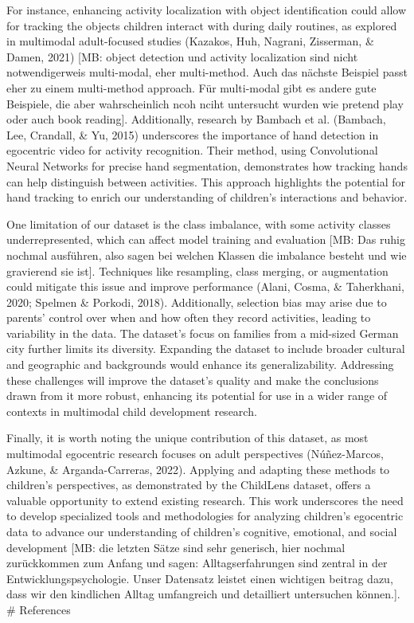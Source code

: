 \documentclass[
  man,floatsintext]{apa6}
\begin{document}
For instance, enhancing activity localization with object identification could allow for tracking the objects children interact with during daily routines, as explored in multimodal adult-focused studies (Kazakos, Huh, Nagrani, Zisserman, \& Damen, 2021) {[}MB: object detection und activity localization sind nicht notwendigerweis multi-modal, eher multi-method. Auch das nächste Beispiel passt eher zu einem multi-method approach. Für multi-modal gibt es andere gute Beispiele, die aber wahrscheinlich ncoh nciht untersucht wurden wie pretend play oder auch book reading{]}. Additionally, research by Bambach et al. (Bambach, Lee, Crandall, \& Yu, 2015) underscores the importance of hand detection in egocentric video for activity recognition. Their method, using Convolutional Neural Networks for precise hand segmentation, demonstrates how tracking hands can help distinguish between activities. This approach highlights the potential for hand tracking to enrich our understanding of children's interactions and behavior.

One limitation of our dataset is the class imbalance, with some activity classes underrepresented, which can affect model training and evaluation {[}MB: Das ruhig nochmal ausführen, also sagen bei welchen Klassen die imbalance besteht und wie gravierend sie ist{]}. Techniques like resampling, class merging, or augmentation could mitigate this issue and improve performance (Alani, Cosma, \& Taherkhani, 2020; Spelmen \& Porkodi, 2018). Additionally, selection bias may arise due to parents' control over when and how often they record activities, leading to variability in the data. The dataset's focus on families from a mid-sized German city further limits its diversity. Expanding the dataset to include broader cultural and geographic and backgrounds would enhance its generalizability. Addressing these challenges will improve the dataset's quality and make the conclusions drawn from it more robust, enhancing its potential for use in a wider range of contexts in multimodal child development research.

Finally, it is worth noting the unique contribution of this dataset, as most multimodal egocentric research focuses on adult perspectives (Núñez-Marcos, Azkune, \& Arganda-Carreras, 2022). Applying and adapting these methods to children's perspectives, as demonstrated by the ChildLens dataset, offers a valuable opportunity to extend existing research. This work underscores the need to develop specialized tools and methodologies for analyzing children's egocentric data to advance our understanding of children's cognitive, emotional, and social development {[}MB: die letzten Sätze sind sehr generisch, hier nochmal zurückkommen zum Anfang und sagen: Alltagserfahrungen sind zentral in der Entwicklungspsychologie. Unser Datensatz leistet einen wichtigen beitrag dazu, dass wir den kindlichen Alltag umfangreich und detailliert untersuchen können.{]}.
\newpage
\# References
\end{document}
